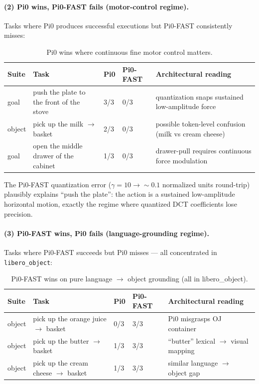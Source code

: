 \documentclass[11pt,letterpaper]{article}
\begin{document}
\paragraph{(2) Pi0 wins, Pi0-FAST fails (motor-control regime).}
Tasks where Pi0 produces successful executions but Pi0-FAST consistently misses:

\begin{table}[h]
\centering
\small
\caption{Pi0 wins where continuous fine motor control matters.}
\begin{tabular}{lllll}
\toprule
\textbf{Suite} & \textbf{Task} & \textbf{Pi0} & \textbf{Pi0-FAST} & \textbf{Architectural reading} \\
\midrule
goal & push the plate to the front of the stove & 3/3 & 0/3 & quantization snaps sustained low-amplitude force \\
object & pick up the milk $\to$ basket & 2/3 & 0/3 & possible token-level confusion (milk vs cream cheese) \\
goal & open the middle drawer of the cabinet & 1/3 & 0/3 & drawer-pull requires continuous force modulation \\
\bottomrule
\end{tabular}
\end{table}

The Pi0-FAST quantization error ($\gamma = 10 \to \sim 0.1$ normalized units round-trip) plausibly explains ``push the plate'': the action is a sustained low-amplitude horizontal motion, exactly the regime where quantized DCT coefficients lose precision.

\paragraph{(3) Pi0-FAST wins, Pi0 fails (language-grounding regime).}
Tasks where Pi0-FAST succeeds but Pi0 misses --- all concentrated in \texttt{libero\_object}:

\begin{table}[h]
\centering
\small
\caption{Pi0-FAST wins on pure language $\to$ object grounding (all in libero\_object).}
\begin{tabular}{lllll}
\toprule
\textbf{Suite} & \textbf{Task} & \textbf{Pi0} & \textbf{Pi0-FAST} & \textbf{Architectural reading} \\
\midrule
object & pick up the orange juice $\to$ basket & 0/3 & 3/3 & Pi0 misgrasps OJ container \\
object & pick up the butter $\to$ basket & 1/3 & 3/3 & ``butter'' lexical $\to$ visual mapping \\
object & pick up the cream cheese $\to$ basket & 1/3 & 3/3 & similar language $\to$ object gap \\
\bottomrule
\end{tabular}
\end{table}
\end{document}
